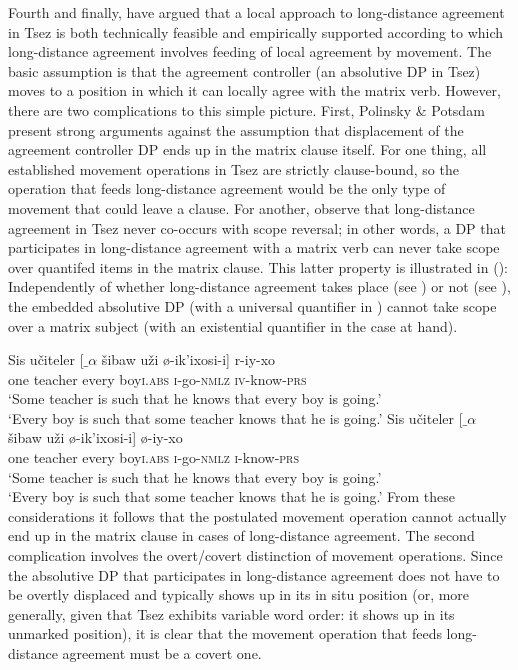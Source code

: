 \documentclass[output=paper
,modfonts
,nonflat]{langsci/langscibook}
\begin{document}
Fourth and finally, \cite{Polinsky&Potsdam:01} have argued that a
local approach to long-distance agreement in Tsez is both technically
feasible and empirically supported according to which long-distance
agreement involves feeding of local agreement by movement. The basic
assumption is that the agreement controller (an absolutive DP in Tsez)
moves to a position in which it can locally agree with the matrix
verb. However, there are two complications to this simple
picture. First, Polinsky \& Potsdam present strong arguments against
the assumption that displacement of the agreement controller DP ends
up in the matrix clause itself. For one thing, all established
movement operations in Tsez are strictly clause-bound, so the 
operation that feeds long-distance agreement would be the only type of
movement that could leave a clause. For another,
\cite{Polinsky&Potsdam:01} observe that long-distance
agreement in Tsez never co-occurs with scope reversal; in other words,
a DP that participates in long-distance agreement with a matrix verb
can never take scope over quantifed items in the matrix clause.
This latter property is illustrated in (\Next): Independently of whether
long-distance agreement takes place (see \Next[b]) or not (see
\Next[a]), the embedded absolutive DP (with a universal quantifier in
\Next) cannot take scope over a  matrix subject (with an existential
quantifier in the case at hand). 

\ea \label{ex:mueller:9}  \label{scope32}
\ea
\gll Sis u\v{c}iteler [$\_${$\alpha$} \v{s}ibaw u\v{z}i \o -ik'ixosi-\textbeltl i] r-iy-xo \\
     one teacher {} every boy{\scshape i}.{\scshape abs} {\scshape i}-go-{\scshape nmlz} {\scshape iv}-know-{\scshape prs}  \\
\glt `Some teacher is such that he knows that every boy is going.'\\
     `Every boy is such that some teacher knows that he is going.'
\ex
\gll Sis u\v{c}iteler [$\_${$\alpha$} \v{s}ibaw u\v{z}i \o -ik'ixosi-\textbeltl i] \o -iy-xo \\
     one teacher {} every boy{\scshape i}.{\scshape abs} {\scshape i}-go-{\scshape nmlz} {\scshape i}-know-{\scshape prs}  \\
\glt      `Some teacher is such that he knows that every boy is going.'\\
    `Every boy is such that some teacher knows that he is going.'
\z
\z
From these considerations it follows that the postulated movement operation
cannot actually end up in the matrix clause in cases of long-distance
agreement. The second complication involves the overt/covert
distinction of movement operations. Since the absolutive DP that participates in
  long-distance agreement does not have to be overtly
  displaced and typically shows up in its in situ position (or, more generally, given
  that Tsez exhibits variable word order: it shows up in its unmarked position),
  it is clear that the movement operation that feeds long-distance
  agreement must be a covert one. 
\end{document}
